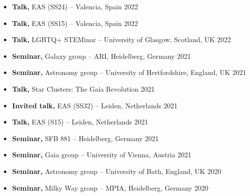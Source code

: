 \begin{itemize}
    \item \textbf{Talk,} EAS (SS24) -- Valencia, Spain \hfill 2022
    \item \textbf{Talk,} EAS (SS15) -- Valencia, Spain \hfill 2022
    \item \textbf{Talk,} LGBTQ+ STEMinar  -- University of Glasgow, Scotland, UK \hfill 2022
    \item \textbf{Seminar,} Galaxy group -- ARI, Heidelberg, Germany \hfill 2021
    \item \textbf{Seminar,} Astronomy group -- University of Hertfordshire, England, UK \hfill 2021
    \item \textbf{Talk,} Star Clusters: The Gaia Revolution \hfill 2021
    \item \textbf{Invited talk,} EAS (SS32) -- Leiden, Netherlands \hfill 2021
    \item \textbf{Talk,} EAS (S15) -- Leiden, Netherlands \hfill 2021
    \item \textbf{Seminar,} SFB 881 -- Heidelberg, Germany \hfill 2021
    \item \textbf{Seminar,} Gaia group -- University of Vienna, Austria \hfill 2021
    \item \textbf{Seminar,} Astronomy group -- University of Bath, England, UK \hfill 2020
    \item \textbf{Seminar,} Milky Way group -- MPIA, Heidelberg, Germany \hfill 2020
\end{itemize}